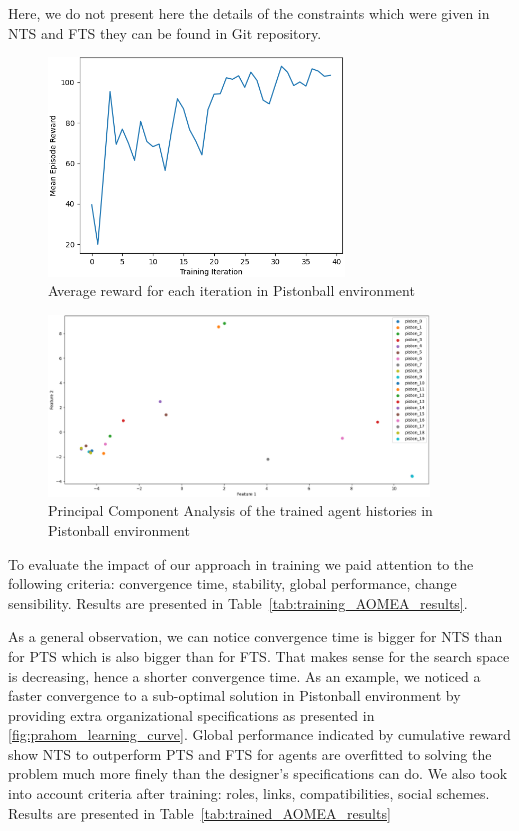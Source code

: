 \documentclass[runningheads]{llncs}
\begin{document}
Here, we do not present here the details of the constraints which were given in NTS and FTS they can be found in Git repository\footnotemark[1].

\begin{figure}[h!]
    \centering
    \includegraphics[width=0.7\textwidth]{figures/prahom_learning_curve.png}
    \caption{Average reward for each iteration in Pistonball environment}
    \label{fig:prahom_learning_curve}
\end{figure}

\begin{figure}[h!]
    \centering
    \includegraphics[width=0.9\textwidth]{figures/prahom_pca_analysis.png}
    \caption{Principal Component Analysis of the trained agent histories in Pistonball environment}
    \label{fig:prahom_pca_analysis}
\end{figure}

To evaluate the impact of our approach in training we paid attention to the following criteria: convergence time, stability, global performance, change sensibility. Results are presented in Table~\ref{tab:training_AOMEA_results}.



As a general observation, we can notice convergence time is bigger for NTS than for PTS which is also bigger than for FTS. That makes sense for the search space is decreasing, hence a shorter convergence time. As an example, we noticed a faster convergence to a sub-optimal solution in Pistonball environment by providing extra organizational specifications as presented in \autoref{fig:prahom_learning_curve}. Global performance indicated by cumulative reward show NTS to outperform PTS and FTS for agents are overfitted to solving the problem much more finely than the designer's specifications can do.
We also took into account criteria after training: roles, links, compatibilities, social schemes. Results are presented in Table~\ref{tab:trained_AOMEA_results}
\end{document}
